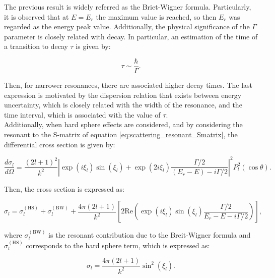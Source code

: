 \documentclass[openany]{book}
\begin{document}
The previous result is widely referred as the Briet-Wigner formula. Particularly, it is observed that at $E = E_r$ the maximum value is reached, so then $E_r$ was regarded as the energy peak value. Additionally, the physical significance of the $\Gamma$ parameter is closely related with decay. In particular, an estimation of the time of a transition to decay $\tau$ is given by: 

\begin{equation} \label{eq:scattering_resonant_tau}
	\tau \sim \frac{\hbar}{\Gamma}.
\end{equation}

Then, for narrower resonances, there are associated higher decay times. The last expression is motivated by the dispersion relation that exists between energy uncertainty, which is closely related with the width of the resonance, and the time interval, which is associated with the value of $\tau$. \\

Additionally, when hard sphere effects are considered, and by considering the resonant to the S-matrix of equation \ref{eq:scattering_resonant_Smatrix}, the differential cross section is given by: 

\begin{equation} \label{eq:scattering_resonant_hardSphere_differentialCrossSection}
	\frac{d\sigma_l}{d\Omega} =  \frac{(2l + 1)^2}{k^2} \left | \exp(i\xi_l)\sin(\xi_l) + \exp(2i\xi_l) \frac{\Gamma/2}{(E_r - E) - i\Gamma/2} \right|^2  P^2_l(\cos \theta ).
\end{equation}

Then, the cross section is expressed as: 

\begin{equation} \label{eq:scattering_resonant_hardSphere_total}
	\sigma_l = \sigma^{(\mathrm{HS})}_{l} + \sigma^{(\mathrm{BW})}_{l} + \frac{4\pi(2l + 1)}{k^2} \left [ 2 \mathrm{Re} \left ( \exp(i\xi_l) \sin (\xi_l) \frac{\Gamma/2}{E_r - E - i\Gamma/2}\right )  \right ],
\end{equation}

where $\sigma^{(\mathrm{BW})}_{l}$ is the resonant contribution due to the Breit-Wigner formula and $\sigma^{(\mathrm{HS})}_{l} $ corresponds to the hard sphere term, which is expressed as: 

\begin{equation} \label{eq:scattering_resonant_hardSphere}
	\sigma_l = \frac{4\pi(2l + 1)}{k^2}  \sin^2 (\xi_l).
\end{equation}
\end{document}
